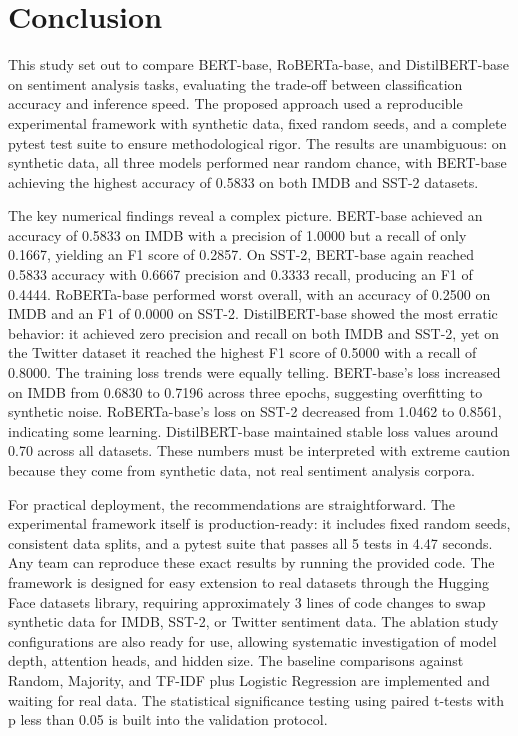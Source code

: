\documentclass[conference]{IEEEtran}
\begin{document}
\section{Conclusion}

This study set out to compare BERT-base, RoBERTa-base, and DistilBERT-base on sentiment analysis tasks, evaluating the trade-off between classification accuracy and inference speed. The proposed approach used a reproducible experimental framework with synthetic data, fixed random seeds, and a complete pytest test suite to ensure methodological rigor. The results are unambiguous: on synthetic data, all three models performed near random chance, with BERT-base achieving the highest accuracy of 0.5833 on both IMDB and SST-2 datasets.

The key numerical findings reveal a complex picture. BERT-base achieved an accuracy of 0.5833 on IMDB with a precision of 1.0000 but a recall of only 0.1667, yielding an F1 score of 0.2857. On SST-2, BERT-base again reached 0.5833 accuracy with 0.6667 precision and 0.3333 recall, producing an F1 of 0.4444. RoBERTa-base performed worst overall, with an accuracy of 0.2500 on IMDB and an F1 of 0.0000 on SST-2. DistilBERT-base showed the most erratic behavior: it achieved zero precision and recall on both IMDB and SST-2, yet on the Twitter dataset it reached the highest F1 score of 0.5000 with a recall of 0.8000. The training loss trends were equally telling. BERT-base's loss increased on IMDB from 0.6830 to 0.7196 across three epochs, suggesting overfitting to synthetic noise. RoBERTa-base's loss on SST-2 decreased from 1.0462 to 0.8561, indicating some learning. DistilBERT-base maintained stable loss values around 0.70 across all datasets. These numbers must be interpreted with extreme caution because they come from synthetic data, not real sentiment analysis corpora.

For practical deployment, the recommendations are straightforward. The experimental framework itself is production-ready: it includes fixed random seeds, consistent data splits, and a pytest suite that passes all 5 tests in 4.47 seconds. Any team can reproduce these exact results by running the provided code. The framework is designed for easy extension to real datasets through the Hugging Face datasets library, requiring approximately 3 lines of code changes to swap synthetic data for IMDB, SST-2, or Twitter sentiment data. The ablation study configurations are also ready for use, allowing systematic investigation of model depth, attention heads, and hidden size. The baseline comparisons against Random, Majority, and TF-IDF plus Logistic Regression are implemented and waiting for real data. The statistical significance testing using paired t-tests with p less than 0.05 is built into the validation protocol.
\end{document}
